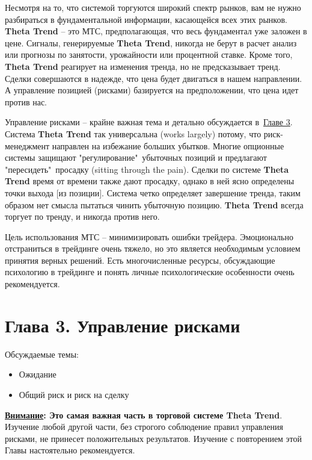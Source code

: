 \documentclass[12pt,DIV=18]{scrartcl}
\begin{document}
\bigskip

Несмотря на то, что системой торгуются широкий спектр рынков, вам не нужно разбираться в фундаментальной информации, касающейся всех этих рынков. \textbf{Theta Trend} -- это МТС, предполагающая, что весь фундаментал уже заложен в цене. Сигналы, генерируемые \textbf{Theta Trend}, никогда не берут в расчет анализ или прогнозы по занятости, урожайности или процентной ставке. Кроме того, \textbf{Theta Trend} реагирует на изменения тренда, но не предсказывает тренд. Сделки совершаются в надежде, что цена будет двигаться в нашем направлении. А управление позицией (рисками) базируется на предположении, что цена идет против нас.

\bigskip

Управление рисками -- крайне важная тема и детально обсуждается в~\hyperref[chapter3]{\ul{Главе 3}}. Система \textbf{Theta Trend} так универсальна (works  largely) потому, что риск-менеджмент направлен на избежание больших убытков. Многие опционные системы защищают "регулирование"\ убыточных позиций и предлагают "пересидеть"\ просадку (sitting through the pain). Сделки по системе \textbf{Theta Trend} время от времени также дают просадку, однако в ней ясно определены точки выхода [из позиции]. Система четко определяет завершение тренда, таким образом нет смысла пытаться чинить убыточную позицию. \textbf{Theta Trend} всегда торгует по тренду, и никогда против него.

\bigskip

Цель использования МТС -- минимизировать ошибки трейдера. Эмоционально отстраниться в трейдинге очень тяжело, но это является необходимым условием принятия верных решений. Есть многочисленные ресурсы, обсуждающие психологию в трейдинге и понять личные психологические особенности очень рекомендуется.

\section*{Глава 3. Управление рисками}
\label{chapter3}
\bigskip

Обсуждаемые темы:

\begin{itemize}
\item Ожидание
\item Общий риск и риск на сделку
\end{itemize}

\bigskip

\textbf{\ul{Внимание}: Это самая важная часть в торговой системе Theta Trend}. Изучение любой другой части, без строгого соблюдение правил управления рисками, не принесет положительных результатов. Изучение с повторением этой Главы настоятельно рекомендуется.
 
\end{document}
